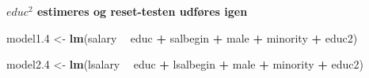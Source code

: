 \documentclass[
  10pt,
]{article}
\newenvironment{Shaded}{\begin{snugshade}}{\end{snugshade}}
\newcommand{\FloatTok}[1]{\textcolor[rgb]{0.00,0.00,0.81}{#1}}
\newcommand{\KeywordTok}[1]{\textcolor[rgb]{0.13,0.29,0.53}{\textbf{#1}}}
\newcommand{\NormalTok}[1]{#1}
\newcommand{\OperatorTok}[1]{\textcolor[rgb]{0.81,0.36,0.00}{\textbf{#1}}}
\newcommand{\StringTok}[1]{\textcolor[rgb]{0.31,0.60,0.02}{#1}}
\begin{document}
\textbf{$educ^2$ estimeres og reset-testen udføres igen}

\begin{Shaded}
\begin{Highlighting}[]
\NormalTok{model1}\FloatTok{.4}\NormalTok{ <-}\StringTok{ }\KeywordTok{lm}\NormalTok{(salary }\OperatorTok{~}\StringTok{ }\NormalTok{educ }\OperatorTok{+}\StringTok{ }\NormalTok{salbegin }\OperatorTok{+}\StringTok{ }\NormalTok{male }\OperatorTok{+}
\StringTok{                      }\NormalTok{minority }\OperatorTok{+}\StringTok{ }\NormalTok{educ2)}

\NormalTok{model2}\FloatTok{.4}\NormalTok{ <-}\StringTok{ }\KeywordTok{lm}\NormalTok{(lsalary }\OperatorTok{~}\StringTok{ }\NormalTok{educ }\OperatorTok{+}\StringTok{  }\NormalTok{lsalbegin }\OperatorTok{+}\StringTok{ }\NormalTok{male }\OperatorTok{+}\StringTok{ }
\StringTok{                 }\NormalTok{minority }\OperatorTok{+}\StringTok{ }\NormalTok{educ2)}


\end{Highlighting}
\end{Shaded}
\end{document}
